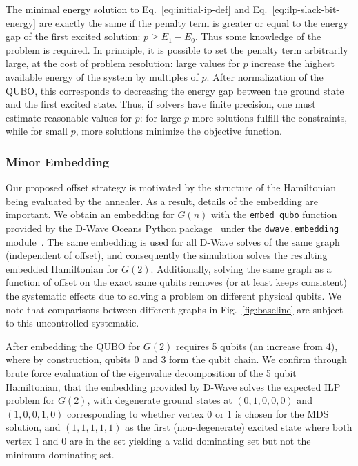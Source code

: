 \documentclass[prd,twocolumn,tightenlines,preprintnumbers,showpacs,superscriptaddress,notitlepage,nofootinbib,eqsecnum,floatfix,longbibliography,aps,10pt]{revtex4-2}
\begin{document}
The minimal energy solution to Eq.~\eqref{eq:initial-ip-def} and Eq.~\eqref{eq:ilp-slack-bit-energy} are exactly the same if the penalty term is greater or equal to the energy gap of the first excited solution: $p \geq E_1 - E_0$.
Thus some knowledge of the problem is required.
In principle, it is possible to set the penalty term arbitrarily large, at the cost of problem resolution: large values for $p$ increase the highest available energy of the system by multiples of $p$.
After normalization of the QUBO, this corresponds to decreasing the energy gap between the ground state and the first excited state.
Thus, if solvers have finite precision, one must estimate reasonable values for $p$: for large $p$ more solutions fulfill the constraints, while for small $p$, more solutions minimize the objective function.

\subsubsection{Minor Embedding}
\label{sec:methods:minor_embedding}
Our proposed offset strategy is motivated by the structure of the Hamiltonian being evaluated by the annealer.
As a result, details of the embedding are important. We obtain an embedding for $G(n)$ with the \texttt{embed\_qubo} function provided by the D-Wave Oceans Python package~\cite{dwave_oceans} under the \texttt{dwave.embedding} module~\cite{2008arXiv0804.4884C}.
The same embedding is used for all D-Wave solves of the same graph (independent of offset), and consequently the simulation solves the resulting embedded Hamiltonian for $G(2)$.
Additionally, solving the same graph as a function of offset on the exact same qubits removes (or at least keeps consistent) the systematic effects due to solving a problem on different physical qubits.
We note that comparisons between different graphs in Fig.~\ref{fig:baseline} are subject to this uncontrolled systematic.

After embedding the QUBO for $G(2)$ requires 5 qubits (an increase from 4), where by construction, qubits 0 and 3 form the qubit chain.
We confirm through brute force evaluation of the eigenvalue decomposition of the 5 qubit Hamiltonian, that the embedding provided by D-Wave solves the expected ILP problem for $G(2)$, with degenerate ground states at $(0, 1, 0, 0, 0)$ and $(1, 0, 0, 1, 0)$ corresponding to whether vertex 0 or 1 is chosen for the MDS solution, and $(1, 1, 1, 1, 1)$ as the first (non-degenerate) excited state where both vertex 1 and 0 are in the set yielding a valid dominating set but not the minimum dominating set.
\end{document}
